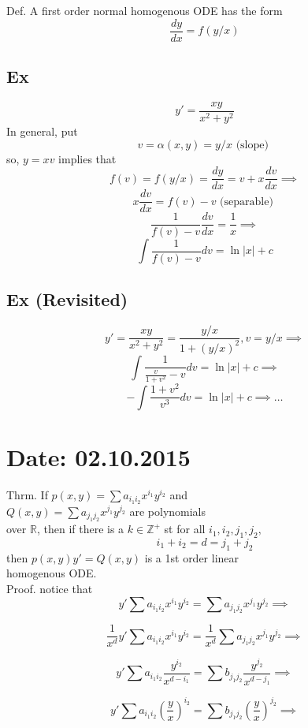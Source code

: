 \documentclass[10pt,a4paper]{article}
\begin{document}
  Def. A first order normal homogenous 
  ODE has the form 
  \[ \frac{dy}{dx} = f(y/x)\]

  \subsection{Ex}
  \[ y' = \frac{xy}{x^2 + y^2}\]
  In general, put 
  \[ v = \alpha (x, y) = y/x \text{ (slope) }\]
  so, \( y = xv\) implies that 
  \[ f(v) = f(y/x) = \frac{dy}{dx} = v + x \frac{dv}{dx} \implies \]
  \[ x \frac{dv}{dx} = f(v) - v \text{ (separable) }\]
  \[ \frac{1}{f(v) -v} \frac{dv}{dx} = \frac{1}{x} \implies \]
  \[ \int \frac{1}{f(v) -v} dv = \ln |x| + c\]

  \subsection{Ex (Revisited)}

  \[ y' = \frac{xy}{x^2 + y^2} = \frac{y/x}{1 + (y/x)^2} , v = y/x
  \implies \]
  \[ \int \frac{1}{\frac{v}{1 + v^2} -v}dv = \ln |x| + c \implies \]
  \[ - \int \frac{1 + v^2}{v^3}dv = \ln |x| + c \implies \dots \]

  \newpage 
{}
\section{Date: 02.10.2015}
  Thrm. If \( p(x, y) = \sum a_{i_1 i_2} x^{i_1} y^{i_2} \) and \\
  \( Q(x, y) = \sum a_{j_1 j_2} x^{j_1} y^{j_2} \) are polynomials \\
  over \( \mathbb{R} \), then if there is a \( k \in \mathbb{Z}^+ \) st
  for all \( i_1, i_2, j_1, j_2,  \)
  \[ i_1 + i_2 = d = j_1 + j_2 \]
  then \( p(x, y)y'=Q(x, y)  \) is a 1st order linear \\
  homogenous ODE.\\
  Proof. notice that 
  \[ y' \sum a_{i_1 i_2} x^{i_1} y^{i_2} = 
  \sum a_{j_1 j_2} x^{j_1} y^{j_2} \implies \]

  \[ \frac{1}{x^d} y' \sum a_{i_1 i_2} x^{i_1} y^{i_2} = 
  \frac{1}{x^d} \sum a_{j_1 j_2} x^{j_1} y^{j_2} \implies \]

  \[ y' \sum a_{i_1 i_2} \frac{y^{i_2}}{x^{d-i_1}} =
   \sum b_{j_1 j_2} \frac{y^{j_2}}{x^{d-j_1}} \implies\]
   
   \[ y' \sum a_{i_1 i_2} (\frac{y}{x})^{i_2} =
   \sum b_{j_1 j_2} (\frac{y}{x})^{j_2}  \implies\]
   
\end{document}
